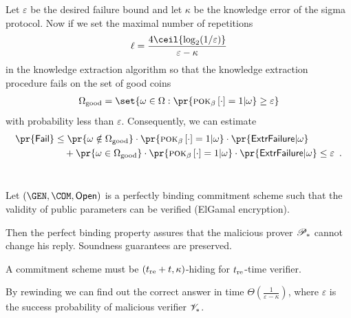 \documentclass[landscape,footrule]{foils}
\begin{document}

Let $\varepsilon$ be the desired failure bound and let $\kappa$ be the
knowledge error of the sigma protocol. Now if we set the maximal
number of repetitions
\begin{align*}
  \ell=\frac{4\ceil{\log_2(1/\varepsilon)}}{\varepsilon-\kappa}
\end{align*}
in the knowledge extraction algorithm so that the knowledge extraction
procedure fails on the set of good coins
\begin{align*}
  \Omega_{\mathrm{good}}=\set{\omega\in\Omega:\pr{\pok{\beta}{\cdot}=1|\omega}\geq \varepsilon}
\end{align*}
with probability less than $\varepsilon$. Consequently, we can estimate
    \begin{align*}
      \pr{\mathsf{Fail}}%
      &\leq\pr{\omega\notin\Omega_{\mathrm{good}}}\cdot\pr{\pok{\beta}{\cdot}=1|\omega}
      \cdot \pr{\mathsf{ExtrFailure}|\omega}\\
      &\quad+\pr{\omega\in\Omega_{\mathrm{good}}}\cdot\pr{\pok{\beta}{\cdot}=1|\omega}\cdot
      \pr{\mathsf{ExtrFailure}|\omega}\leq\varepsilon\enspace.
    \end{align*}\ \vspace*{-8ex}\\





Let $(\GEN,\COM,\OPEN)$ is a perfectly binding commitment
scheme such that the validity of public parameters can be verified
(ElGamal encryption).
\begin{triangles}
\item Then the perfect binding property assures that the malicious
  prover $\mathscr{P}_*$ cannot change his reply. Soundness guarantees are
  preserved.
\item A commitment scheme must be $(t_{\mathrm{re}}+t,\kappa)$-hiding for $t_{\mathrm{re}}$-time verifier.
\item By rewinding we can find out the correct answer in time
  $\Theta(\frac{1}{\varepsilon-\kappa})$, where $\varepsilon$ is the
  success probability of malicious verifier $\mathscr{V}_*$.
\end{triangles}
\end{document}
